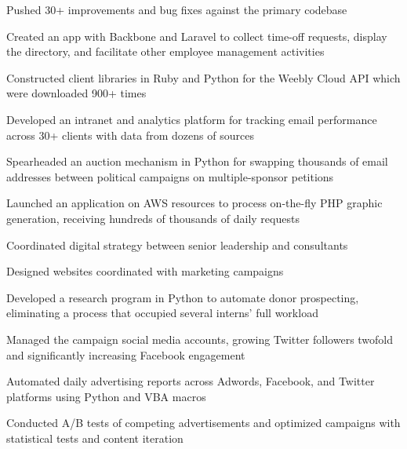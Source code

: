 \begin{listitems}
\item Pushed 30+ improvements and bug fixes against the primary codebase
\item Created an app with Backbone and Laravel to collect time-off requests, display the directory, and facilitate other employee management activities
\item Constructed client libraries in Ruby and Python for the Weebly Cloud API which were downloaded 900+ times
\end{listitems}
\sectionsep

\begin{listitems}
\item Developed an intranet and analytics platform for tracking email performance across 30+ clients with data from dozens of sources
\item Spearheaded an auction mechanism in Python for swapping thousands of email addresses between political campaigns on multiple-sponsor petitions
\item Launched an application on AWS resources to process on-the-fly PHP graphic generation, receiving hundreds of thousands of daily requests
\end{listitems}
\sectionsep

\begin{listitems}
\item Coordinated digital strategy between senior leadership and consultants
\item Designed websites coordinated with marketing campaigns
\item Developed a research program in Python to automate donor prospecting, eliminating a process that occupied several interns' full workload
\item Managed the campaign social media accounts, growing Twitter followers twofold and significantly increasing Facebook engagement
\end{listitems}
\sectionsep

\begin{listitems}
\item Automated daily advertising reports across Adwords, Facebook, and Twitter platforms using Python and VBA macros
\item Conducted A/B tests of competing advertisements and optimized campaigns with statistical tests and content iteration
\end{listitems}
\sectionsep
